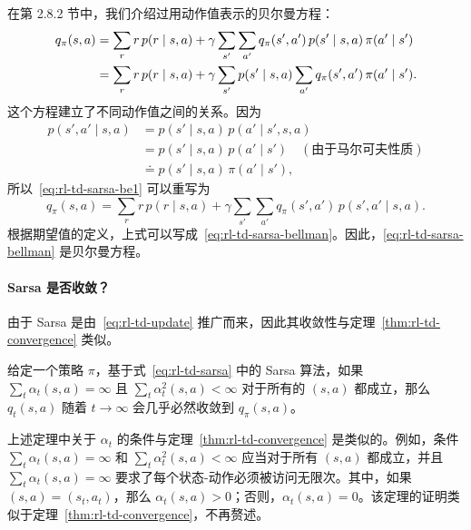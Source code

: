 \begin{derivation}
\label{box:rl-td-sarsa-be}
在第 2.8.2 节中，我们介绍过用动作值表示的贝尔曼方程：
\begin{align}
  q_{\pi}(s, a) &= \sum_r r\, p(r \mid s, a) + \gamma \sum_{s'} \sum_{a'} q_{\pi}(s', a')\, p(s' \mid s, a)\, \pi(a' \mid s') \notag \\
  &= \sum_r r\, p(r \mid s, a) + \gamma \sum_{s'} p(s' \mid s, a) \sum_{a'} q_{\pi}(s', a')\, \pi(a' \mid s').
  \label{eq:rl-td-sarsa-be1}
\end{align}
这个方程建立了不同动作值之间的关系。因为
\begin{align*}
  p(s', a' \mid s, a) &= p(s' \mid s, a)\, p(a' \mid s', s, a) \\
  &= p(s' \mid s, a)\, p(a' \mid s') \quad (\text{由于马尔可夫性质}) \\
  &\doteq p(s' \mid s, a)\, \pi(a' \mid s'),
\end{align*}
所以~\eqref{eq:rl-td-sarsa-be1} 可以重写为
\[
  q_{\pi}(s, a) = \sum_r r\, p(r \mid s, a) + \gamma \sum_{s'} \sum_{a'} q_{\pi}(s', a')\, p(s', a' \mid s, a).
\]
根据期望值的定义，上式可以写成~\eqref{eq:rl-td-sarsa-bellman}。因此，\eqref{eq:rl-td-sarsa-bellman} 是贝尔曼方程。
\end{derivation}

\paragraph{Sarsa 是否收敛？}
由于 Sarsa 是由~\eqref{eq:rl-td-update} 推广而来，因此其收敛性与定理~\ref{thm:rl-td-convergence} 类似。

\begin{theorem}
\label{thm:rl-td-sarsa-convergence}
给定一个策略 $\pi$，基于式~\eqref{eq:rl-td-sarsa} 中的 Sarsa 算法，如果 $\sum_t \alpha_t(s, a) = \infty$ 且 $\sum_t \alpha_t^2(s, a) < \infty$ 对于所有的 $(s, a)$ 都成立，那么 $q_t(s, a)$ 随着 $t \to \infty$ 会几乎必然收敛到 $q_{\pi}(s, a)$。
\end{theorem}

上述定理中关于 $\alpha_t$ 的条件与定理~\ref{thm:rl-td-convergence} 是类似的。例如，条件 $\sum_t \alpha_t(s, a) = \infty$ 和 $\sum_t \alpha_t^2(s, a) < \infty$ 应当对于所有 $(s, a)$ 都成立，并且 $\sum_t \alpha_t(s, a) = \infty$ 要求了每个状态-动作必须被访问无限次。其中，如果 $(s, a) = (s_t, a_t)$，那么 $\alpha_t(s, a) > 0$；否则，$\alpha_t(s, a) = 0$。该定理的证明类似于定理~\ref{thm:rl-td-convergence}，不再赘述。

